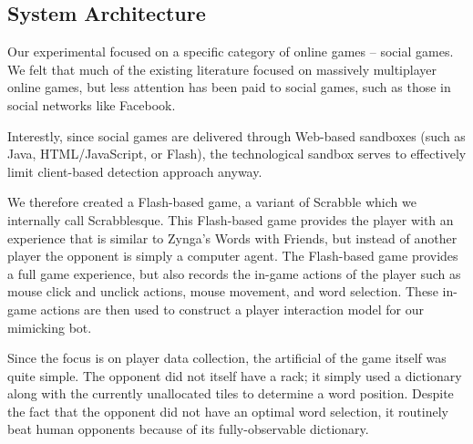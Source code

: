 \documentclass{acm_proc_article-sp}
\begin{document}
\subsection{System Architecture}

Our experimental focused on a specific category of online games -- social games. We felt that much of the existing literature focused on massively multiplayer online games, but less attention has been paid to social games, such as those in social networks like Facebook.

Interestly, since social games are delivered through Web-based sandboxes (such as Java, HTML/JavaScript, or Flash), the technological sandbox serves to effectively limit client-based detection approach anyway.

We therefore created a Flash-based game, a variant of Scrabble which we internally call Scrabblesque. This Flash-based game provides the player with an experience that is similar to Zynga's Words with Friends, but instead of another player the opponent is simply a computer agent. The Flash-based game provides a full game experience, but also records the in-game actions of the player such as mouse click and unclick actions, mouse movement, and word selection. These in-game actions are then used to construct a player interaction model for our mimicking bot.

Since the focus is on player data collection, the artificial of the game itself was quite simple. The opponent did not itself have a rack; it simply used a dictionary along with the currently unallocated tiles to determine a word position. Despite the fact that the opponent did not have an optimal word selection, it routinely beat human opponents because of its fully-observable dictionary.
\end{document}
